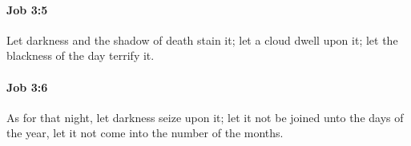 		\paragraph{Job 3:5} %
			\label{JOB-3-5}

			Let darkness and the shadow of death stain it; let a cloud dwell upon it; let the blackness of the day terrify it.


		\paragraph{Job 3:6} %
			\label{JOB-3-6}

			As for that night, let darkness seize upon it; let it not be joined unto the days of the year, let it not come into the number of the months.


